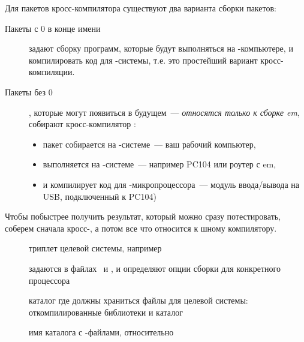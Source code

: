 



\secdown

Для пакетов кросс-компилятора существуют два варианта сборки пакетов:

\begin{description}

\item[Пакеты с 0 в конце имени] задают сборку программ, которые будут
выполняться на -компьютере, и компилировать код для -системы, т.е. это
простейший вариант кросс-компиляции.

\item[Пакеты без 0], которые могут появиться в будущем\ --- \emph{относятся
только к сборке em\linux}, собирают кросс-компилятор :

\begin{itemize}[nosep]
\item пакет собирается на -системе\ --- ваш рабочий компьютер,
\item выполняется на -системе\ --- например PC104 или роутер с
em\linux,
\item и компилирует код для -микропроцессора\ --- модуль
ввода/вывода на USB, подключенный к PC104)
\end{itemize}
 
\end{description}


Чтобы побыстрее получить результат, который можно сразу потестировать, соберем
сначала кросс-, а потом все что относится к \ci шному
компилятору.

\begin{description}
\item[] триплет целевой системы, например 
\item[] задаются в файлах \ и
, и определяют опции сборки  для
конкретного процессора
\item[] каталог где должны храниться файлы для целевой
системы: откомпилированные библиотеки и каталог 
\item[] имя каталога с
-файлами, относительно 
\end{description}

